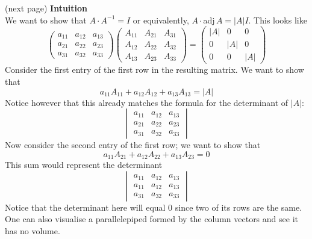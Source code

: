 \documentclass{report}
\begin{document}
(next page)
\newpage
\noindent\textbf{Intuition}\\
We want to show that $A\cdot A^{-1}=I$ or equivalently, $A\cdot$adj$\,A=|A|I$. This looks like
\begin{equation*}
\begin{pmatrix}
a_{11}&a_{12}&a_{13}\\
a_{21}&a_{22}&a_{23}\\
a_{31}&a_{32}&a_{33}
\end{pmatrix}
\begin{pmatrix}
A_{11}&A_{21}&A_{31}\\
A_{12}&A_{22}&A_{32}\\
A_{13}&A_{23}&A_{33}
\end{pmatrix}=
\begin{pmatrix}
|A|&0&0\\
0&|A|&0\\
0&0&|A|
\end{pmatrix}
\end{equation*}
Consider the first entry of the first row in the resulting matrix. We want to show that
\begin{equation*}
a_{11}A_{11}+a_{12}A_{12}+a_{13}A_{13}=|A|
\end{equation*}
Notice however that this already matches the formula for the determinant of $|A|$:
\begin{equation*}
\begin{vmatrix}
a_{11}&a_{12}&a_{13}\\
a_{21}&a_{22}&a_{23}\\
a_{31}&a_{32}&a_{33}
\end{vmatrix}
\end{equation*}
Now consider the second entry of the first row; we want to show that
\begin{equation*}
a_{11}A_{21}+a_{12}A_{22}+a_{13}A_{23}=0
\end{equation*}
This sum would represent the determinant
\begin{equation*}
\begin{vmatrix}
a_{11}&a_{12}&a_{13}\\
a_{11}&a_{12}&a_{13}\\
a_{31}&a_{32}&a_{33}
\end{vmatrix}
\end{equation*}
Notice that the determinant here will equal 0 since two of its rows are the same. 
One can also visualise a parallelepiped formed by the column vectors and see it has no volume.
\newpage
\end{document}
